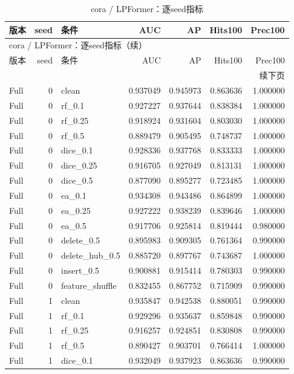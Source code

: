 \documentclass[UTF8,a4paper,11pt,fontset=fandol]{ctexart}
\begin{document}
{\footnotesize
\setlength{\tabcolsep}{3pt}
\begin{longtable}{lrlrrrr}
\caption{cora / LPFormer：逐seed指标}\\
\toprule
版本 & seed & 条件 & AUC & AP & Hits100 & Prec100 \\
\midrule
\endfirsthead
\multicolumn{7}{l}{cora / LPFormer：逐seed指标（续）}\\
\toprule
版本 & seed & 条件 & AUC & AP & Hits100 & Prec100 \\
\midrule
\endhead
\midrule\multicolumn{7}{r}{续下页}\\
\endfoot
\bottomrule\endlastfoot
Full & 0 & clean & 0.937049 & 0.945973 & 0.863636 & 1.000000 \\
Full & 0 & rf\_0.1 & 0.927227 & 0.937644 & 0.838384 & 1.000000 \\
Full & 0 & rf\_0.25 & 0.918924 & 0.931604 & 0.803030 & 1.000000 \\
Full & 0 & rf\_0.5 & 0.889479 & 0.905495 & 0.748737 & 1.000000 \\
Full & 0 & dice\_0.1 & 0.928336 & 0.937768 & 0.833333 & 1.000000 \\
Full & 0 & dice\_0.25 & 0.916705 & 0.927049 & 0.813131 & 1.000000 \\
Full & 0 & dice\_0.5 & 0.877090 & 0.895277 & 0.723485 & 1.000000 \\
Full & 0 & ea\_0.1 & 0.934308 & 0.943486 & 0.864899 & 1.000000 \\
Full & 0 & ea\_0.25 & 0.927222 & 0.938239 & 0.839646 & 1.000000 \\
Full & 0 & ea\_0.5 & 0.917706 & 0.925814 & 0.819444 & 0.980000 \\
Full & 0 & delete\_0.5 & 0.895983 & 0.909305 & 0.761364 & 0.990000 \\
Full & 0 & delete\_hub\_0.5 & 0.885720 & 0.897767 & 0.743687 & 1.000000 \\
Full & 0 & insert\_0.5 & 0.900881 & 0.915414 & 0.780303 & 0.990000 \\
Full & 0 & feature\_shuffle & 0.832455 & 0.867752 & 0.715909 & 0.990000 \\
Full & 1 & clean & 0.935847 & 0.942538 & 0.880051 & 0.990000 \\
Full & 1 & rf\_0.1 & 0.929296 & 0.935637 & 0.859848 & 0.990000 \\
Full & 1 & rf\_0.25 & 0.916257 & 0.924851 & 0.830808 & 0.990000 \\
Full & 1 & rf\_0.5 & 0.890427 & 0.903701 & 0.766414 & 1.000000 \\
Full & 1 & dice\_0.1 & 0.932049 & 0.937923 & 0.863636 & 0.990000 \\

\end{longtable}}
\end{document}
